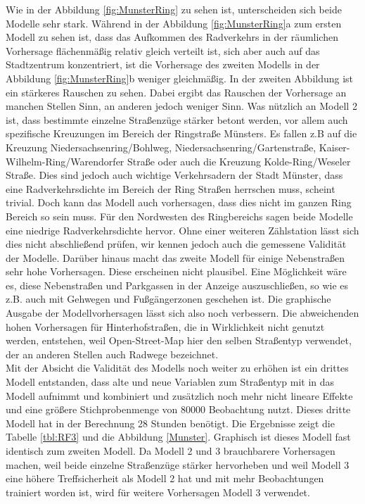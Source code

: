 \documentclass[a4paper,12pt]{thesis}
\begin{document}
Wie in der Abbildung \ref{fig:MunsterRing} zu sehen ist, unterscheiden sich beide Modelle sehr stark. Während in der Abbildung \ref{fig:MunsterRing}a zum ersten Modell zu sehen ist, dass das Aufkommen des Radverkehrs in der räumlichen Vorhersage flächenmäßig relativ gleich verteilt ist, sich aber auch auf das Stadtzentrum konzentriert, ist die Vorhersage des zweiten Modells in der Abbildung \ref{fig:MunsterRing}b weniger gleichmäßig. In der zweiten Abbildung ist ein stärkeres Rauschen zu sehen. Dabei ergibt das Rauschen der Vorhersage an manchen Stellen Sinn, an anderen jedoch weniger Sinn. Was nützlich an Modell 2 ist, dass bestimmte einzelne Straßenzüge stärker betont werden, vor allem auch spezifische Kreuzungen im Bereich der Ringstraße Münsters. Es fallen z.B auf die Kreuzung Niedersachsenring/Bohlweg, Niedersachsenring/Gartenstraße, Kaiser-Wilhelm-Ring/Warendorfer Straße oder auch die Kreuzung Kolde-Ring/Weseler Straße. Dies sind jedoch auch wichtige Verkehrsadern der Stadt Münster, dass eine Radverkehrsdichte im Bereich der Ring Straßen herrschen muss, scheint trivial. Doch kann das Modell auch vorhersagen, dass dies nicht im ganzen Ring Bereich so sein muss. Für den Nordwesten des Ringbereichs sagen beide Modelle eine niedrige Radverkehrsdichte hervor. Ohne einer weiteren Zählstation lässt sich dies nicht abschließend prüfen, wir kennen jedoch auch die gemessene Validität der Modelle. Darüber hinaus macht das zweite Modell für einige Nebenstraßen sehr hohe Vorhersagen. Diese erscheinen nicht plausibel. Eine Möglichkeit wäre es, diese Nebenstraßen und Parkgassen in der Anzeige auszuschließen, so wie es z.B. auch mit Gehwegen und Fußgängerzonen geschehen ist. Die graphische Ausgabe der Modellvorhersagen lässt sich also noch verbessern. Die abweichenden hohen Vorhersagen für Hinterhofstraßen, die in Wirklichkeit nicht genutzt werden, entstehen, weil Open-Street-Map hier den selben Straßentyp verwendet, der an anderen Stellen auch Radwege bezeichnet.\\
Mit der Absicht die Validität des Modells noch weiter zu erhöhen ist ein drittes Modell entstanden, dass alte und neue Variablen zum  Straßentyp mit in das Modell aufnimmt und kombiniert und zusätzlich noch mehr nicht lineare Effekte und eine größere Stichprobenmenge von 80000 Beobachtung nutzt. Dieses dritte Modell hat in der Berechnung 28 Stunden benötigt. Die Ergebnisse zeigt die Tabelle \ref{tbl:RF3} und die Abbildung \ref{Munster}. Graphisch ist dieses Modell fast identisch zum zweiten Modell. Da Modell 2 und 3 brauchbarere Vorhersagen machen, weil beide einzelne Straßenzüge stärker hervorheben und weil Modell 3 eine höhere Treffsicherheit als Modell 2 hat und mit mehr Beobachtungen trainiert worden ist, wird für weitere Vorhersagen Modell 3 verwendet.
\end{document}
